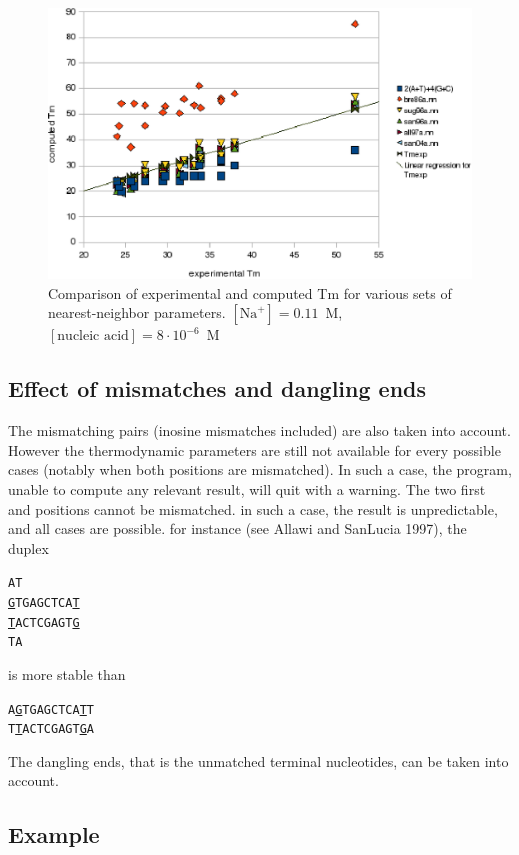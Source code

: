 \documentclass{article}
\begin{document}
\begin{figure}
\caption{Comparison of experimental and computed Tm for various sets of
  nearest-neighbor parameters. $[\mbox{Na}^+] = 0.11$~M, $[\mbox{nucleic acid}] = 8\cdot{}10^{-6}$~M}
\includegraphics{image0_11M.eps}
\end{figure}
   
\subsection{Effect of mismatches and dangling ends}  

The mismatching pairs (inosine  mismatches  included) are also taken into account. However the thermodynamic
parameters are still not available for every possible cases (notably when both
positions are mismatched). In such a case, the program, unable to compute any
relevant result, will quit with a warning.  The two first and positions cannot
be mismatched. in such a case, the result is unpredictable, and all cases are
possible. for instance (see Allawi and SanLucia 1997), the duplex
\begin{alltt}
A          T  
 \underline{G}TGAGCTCA\underline{T}  
 \underline{T}ACTCGAGT\underline{G}  
T          A   
\end{alltt}

is more stable than 

\begin{alltt}
A\underline{G}TGAGCTCA\underline{T}T 
T\underline{T}ACTCGAGT\underline{G}A 
\end{alltt}
   
The dangling ends, that is the unmatched terminal nucleotides, can be taken into
account.

\subsection{Example}
\end{document}
